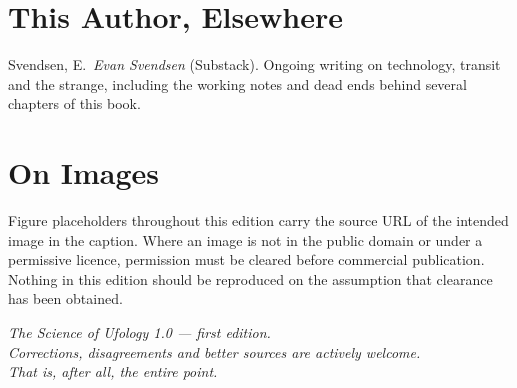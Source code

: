 \section*{This Author, Elsewhere}

\begin{list}{}{\setlength{\leftmargin}{1.2em}\setlength{\itemindent}{-1.2em}
\setlength{\itemsep}{3pt}}
\item Svendsen, E.\ \emph{Evan Svendsen} (Substack). Ongoing writing on technology, transit and the
strange, including the working notes and dead ends behind several chapters of this book.
\end{list}

\section*{On Images}

Figure placeholders throughout this edition carry the source URL of the intended image in the caption.
Where an image is not in the public domain or under a permissive licence, permission must be cleared
before commercial publication. Nothing in this edition should be reproduced on the assumption that
clearance has been obtained.

\endgroup

\vspace{18pt}
\begin{center}
{\footnotesize\itshape\color{steel} The Science of Ufology 1.0 --- first edition.\\
Corrections, disagreements and better sources are actively welcome.\\
That is, after all, the entire point.}
\end{center}
